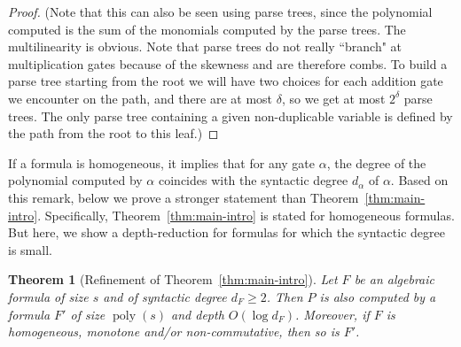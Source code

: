 \documentclass[11pt,a4paper]{article}
\newtheorem{theorem}{Theorem}
\newcommand{\poly}{\mathop{\mathrm{poly}}}
\begin{document}
\begin{proof}
	(Note that this can also be seen using parse trees, since the polynomial computed is the sum of the monomials computed by the parse trees. The multilinearity is obvious. Note that parse trees do not really ``branch" at multiplication gates because of the skewness and are therefore combs.  To build a parse tree starting from the root we will have two choices for each addition gate we encounter on the path, and there are at most $\delta$, so we get at most $2^\delta$ parse trees. The only parse tree containing a given non-duplicable variable is defined by the path from the root to this leaf.)
\end{proof}

If a formula is homogeneous, it implies that for any gate \(\alpha\), the degree of the polynomial computed by \(\alpha\) coincides with the syntactic degree \(d_{\alpha}\) of \(\alpha\). Based on this remark, below we prove a stronger statement than Theorem~\ref{thm:main-intro}. Specifically, Theorem~\ref{thm:main-intro} is stated for homogeneous formulas. But here, we show a depth-reduction for formulas for which the syntactic degree is small. 

\begin{theorem}[Refinement of  Theorem~\ref{thm:main-intro}]
	\label{thm:main-syntactic-degree}
	Let $F$ be an algebraic formula of size $s$ and of syntactic degree \(d_F \geq 2\). Then $P$ is also computed by a formula $F'$ of size $\poly(s)$ and depth $O(\log d_F)$. Moreover, if $F$ is homogeneous, monotone and/or non-commutative, then so is $F'$.
\end{theorem}
\end{document}
